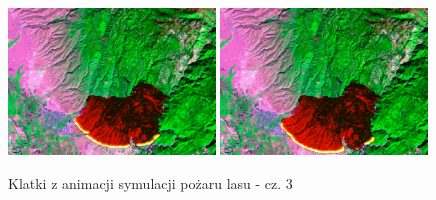 \documentclass{article}
\begin{document}
\begin{figure}
        \\[\smallskipamount]
        \includegraphics[width=0.49\textwidth]{resources/wildfire.overlay.132.png}\hfill
        \includegraphics[width=0.49\textwidth]{resources/wildfire.overlay.144.png}
        \caption{Klatki z animacji symulacji pożaru lasu - cz. 3}
        \label{frames-3}
    \end{figure}
\end{document}
